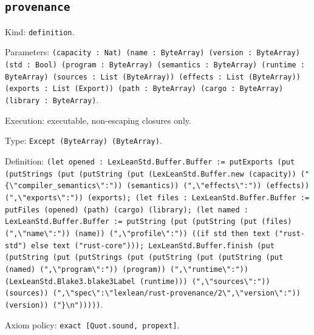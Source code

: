 \documentclass[11pt]{article}
\begin{document}
\subsection*{\texttt{provenance}}
\noindent Kind: \texttt{definition}.\par
\noindent Parameters: \texttt{(capacity : Nat) (name : ByteArray) (version : ByteArray) (std : Bool) (program : ByteArray) (semantics : ByteArray) (runtime : ByteArray) (sources : List (ByteArray)) (effects : List (ByteArray)) (exports : List (Export)) (path : ByteArray) (cargo : ByteArray) (library : ByteArray)}.\par
\noindent Execution: executable, non-escaping closures only.\par
\noindent Type: \texttt{Except (ByteArray) (ByteArray)}.\par
\noindent Definition: \texttt{(let opened : LexLeanStd.Buffer.Buffer := putExports (put (putStrings (put (putString (put (LexLeanStd.Buffer.new (capacity)) ("\{\textbackslash{}"compiler\_semantics\textbackslash{}":")) (semantics)) (",\textbackslash{}"effects\textbackslash{}":")) (effects)) (",\textbackslash{}"exports\textbackslash{}":")) (exports); (let files : LexLeanStd.Buffer.Buffer := putFiles (opened) (path) (cargo) (library); (let named : LexLeanStd.Buffer.Buffer := putString (put (putString (put (files) (",\textbackslash{}"name\textbackslash{}":")) (name)) (",\textbackslash{}"profile\textbackslash{}":")) ((if std then text ("rust-std") else text ("rust-core"))); LexLeanStd.Buffer.finish (put (putString (put (putStrings (put (putString (put (putString (put (named) (",\textbackslash{}"program\textbackslash{}":")) (program)) (",\textbackslash{}"runtime\textbackslash{}":")) (LexLeanStd.Blake3.blake3Label (runtime))) (",\textbackslash{}"sources\textbackslash{}":")) (sources)) (",\textbackslash{}"spec\textbackslash{}":\textbackslash{}"lexlean/rust-provenance/2\textbackslash{}",\textbackslash{}"version\textbackslash{}":")) (version)) ("\}\textbackslash{}n")))))}.\par
\noindent Axiom policy: \texttt{exact [Quot.sound, propext]}.\par
\end{document}

